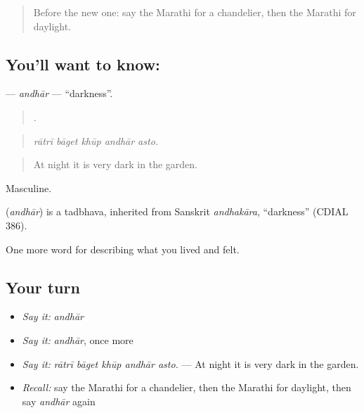 \label{lesson:MR-C519-andhar}



\begin{quote}
Before the new one: say the Marathi for a chandelier, then the Marathi for daylight.
\end{quote}

\subsection*{You'll want to know: }
\textbf{} — \emph{andhār} — \textquotedblleft{}darkness\textquotedblright{}.

\begin{quote}
    .
\end{quote}

\begin{quote}
\emph{rātrī bāget khūp andhār asto.}
\end{quote}

\begin{quote}
At night it is very dark in the garden.
\end{quote}

Masculine.

\begin{cousinweb}
\textbf{} (\emph{andhār}) is a tadbhava, inherited from Sanskrit \emph{andhakāra}, \textquotedblleft{}darkness\textquotedblright{} (CDIAL 386).
\end{cousinweb}

\begin{grammarlens}[title={What you've built}]
One more word for describing what you lived and felt.
\end{grammarlens}

\subsection*{Your turn}
\begin{itemize}
\raggedright
  \item \emph{Say it:} \emph{andhār}
  \item \emph{Say it:} \emph{andhār}, once more
  \item \emph{Say it:} \emph{rātrī bāget khūp andhār asto.} — At night it is very dark in the garden.
  \item \emph{Recall:} say the Marathi for a chandelier, then the Marathi for daylight, then say \emph{andhār} again
\end{itemize}

